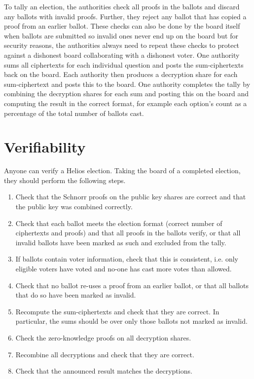 \documentclass[envcountsame]{llncs}
\begin{document}
To tally an election, the authorities check all proofs in the ballots and
discard any ballots with invalid proofs. Further, they reject any ballot that
has copied a proof from an earlier ballot\footnotemark. These checks can also
be done by the board itself when ballots are submitted so invalid ones never end
up on the board but for security reasons, the authorities always need to
repeat these checks to protect against a dishonest board collaborating with a
dishonest voter.
One authority sums all ciphertexts for each individual question and posts
the sum-ciphertexts back on the board. Each authority then produces a
decryption share for each sum-ciphertext and posts this to the board. One
authority completes the tally by combining the decryption shares for each sum
and posting this on the board and computing the result in the correct format,
for example each option's count as a percentage of the total number of ballots
cast.

\section{Verifiability}

Anyone can verify a Helios election. Taking the board of a completed election,
they should perform the following steps.
\begin{enumerate}
\item Check that the Schnorr proofs on the public key shares are correct and
that the public key was combined correctly.
\item Check that each ballot meets the election format (correct number of
ciphertexts and proofs) and that all proofs in the ballots verify, or that all
invalid ballots have been marked as such and excluded from the tally.
\item If ballots contain voter information, check that this is consistent, i.e.
only eligible voters have voted and no-one has cast more votes than allowed.
\item Check that no ballot re-uses a proof from an earlier ballot, or that all
ballots that do so have been marked as invalid.
\item Recompute the sum-ciphertexts and check that they are correct.
In particular, the sums should be over only those ballots not marked as invalid.
\item Check the zero-knowledge proofs on all decryption shares.
\item Recombine all decryptions and check that they are correct.
\item Check that the announced result matches the decryptions.
\end{enumerate}
\end{document}
